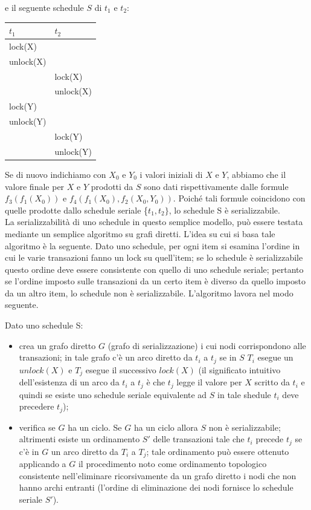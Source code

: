 e il seguente schedule $S$ di $t_1$ e $t_2$:
\begin{center}
 \begin{tabular}{|l|l|}
 \hline
 $t_1$ & $t_2$\\
 \hline
   lock(X)&\\
   unlock(X)&\\
   &lock(X)\\
   &unlock(X)\\
   lock(Y)&\\ 
   unlock(Y)&\\
   &lock(Y)\\
   &unlock(Y)\\
   \hline
  \end{tabular}
\end{center}

Se di nuovo indichiamo con $X_0$ e $Y_0$ i valori iniziali di $X$ e $Y$, abbiamo che il valore finale per $X$ e $Y$
prodotti da $S$ sono dati rispettivamente dalle formule $f_3(f_1(X_0))$ e $f_4(f_1(X_0), f_2(X_0, Y_0))$. Poiché tali
formule coincidono con quelle prodotte dallo schedule seriale \{$t_1, t_2\}$, lo schedule S è serializzabile.\\

La serializzabilità di uno schedule in questo semplice modello, può essere testata mediante un
semplice algoritmo su grafi diretti. L'idea su cui si basa tale algoritmo è la seguente. Dato uno
schedule, per ogni item si esamina l'ordine in cui le varie transazioni fanno un lock su quell'item; se
lo schedule è serializzabile questo ordine deve essere consistente con quello di uno schedule seriale;
pertanto se l'ordine imposto sulle transazioni da un certo item è diverso da quello imposto da un
altro item, lo schedule non è serializzabile. L'algoritmo lavora nel modo seguente.

\begin{alg}
Dato uno schedule S:
\begin{itemize}
 \item crea un grafo diretto $G$ (grafo di serializzazione) i cui nodi corrispondono alle transazioni; in
tale grafo c'è un arco diretto da $t_i$ a $t_j$ se in $S$ $T_i$ esegue un $unlock(X)$ e $T_j$ esegue il successivo
$lock(X)$ (il significato intuitivo dell'esistenza di un arco da $t_i$ a $t_j$ è che $t_j$ legge il valore per $X$
scritto da $t_i$ e quindi se esiste uno schedule seriale equivalente ad $S$ in tale shedule $t_i$ deve
precedere $t_j$);
\item verifica se $G$ ha un ciclo. Se $G$ ha un ciclo allora $S$ non è serializzabile; altrimenti esiste un
ordinamento $S'$ delle transazioni tale che $t_i$ precede $t_j$ se c'è in $G$ un arco diretto da $T_i$ a $T_j$; tale
ordinamento può essere ottenuto applicando a $G$ il procedimento noto come ordinamento
topologico consistente nell'eliminare ricorsivamente da un grafo diretto i nodi che non hanno
archi entranti (l'ordine di eliminazione dei nodi fornisce lo schedule seriale $S'$).
\end{itemize}
\end{alg}

